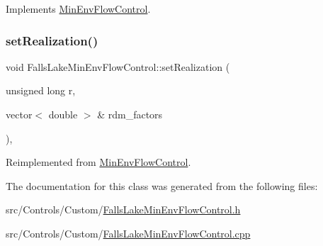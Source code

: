 Implements \mbox{\hyperlink{classMinEnvFlowControl_a5de79615852eb0c937dd559a9eb9402d}{Min\+Env\+Flow\+Control}}.

\mbox{\label{classFallsLakeMinEnvFlowControl_a6ea8a5e9ff9179066cceb77d896f3f97}} 
\subsubsection{\texorpdfstring{set\+Realization()}{setRealization()}}
{\footnotesize\ttfamily void Falls\+Lake\+Min\+Env\+Flow\+Control\+::set\+Realization (\begin{DoxyParamCaption}\item[{unsigned long}]{r,  }\item[{vector$<$ double $>$ \&}]{rdm\+\_\+factors }\end{DoxyParamCaption})\hspace{0.3cm}{\ttfamily [override]}, {\ttfamily [virtual]}}



Reimplemented from \mbox{\hyperlink{classMinEnvFlowControl_aff9774bd700410f9cd9a04e323f824c8}{Min\+Env\+Flow\+Control}}.



The documentation for this class was generated from the following files\+:\begin{DoxyCompactItemize}
\item 
src/\+Controls/\+Custom/\mbox{\hyperlink{FallsLakeMinEnvFlowControl_8h}{Falls\+Lake\+Min\+Env\+Flow\+Control.\+h}}\item 
src/\+Controls/\+Custom/\mbox{\hyperlink{FallsLakeMinEnvFlowControl_8cpp}{Falls\+Lake\+Min\+Env\+Flow\+Control.\+cpp}}\end{DoxyCompactItemize}
